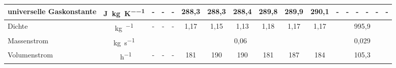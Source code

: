 \begin{landscape}
\begin{table}[h!]
{\begin{tabular}{l|c|c|c|c|c|c|c|c|c|c|c|c|c|c|c|c}
					universelle Gaskonstante & \si{\joule \per \kg \per \kelvin} & -     & -     & -     & 288,3 & 288,3 & 288,4 & 289,8 & 289,9 & 290,1 & -     & -     & -     & -     & -     & - \\
					\hline
					Dichte & \si{\kg\per\kmeter} & -     & -     & -     & \multicolumn{1}{c|}{1,17} & \multicolumn{1}{c|}{1,15} & 1,13  & \multicolumn{1}{c|}{1,18} & \multicolumn{1}{c|}{1,17} & \multicolumn{1}{c|}{1,17} & \multicolumn{6}{c}{995,9} \\
					\hline
					Massenstrom & \si{\kg\per\second}  &     \multicolumn{9}{|c|}{0,06}    & \multicolumn{6}{c}{0,029} \\
					\hline
					Volumenstrom & \si{\kmeter \per \hour} & -     & -     & -     & 181   & 190   & 190   & 181   & 187   & 184   & \multicolumn{6}{c}{105,3} \\
				\end{tabular}
			}
		\end{table}%
		\FloatBarrier
	\end{landscape}


